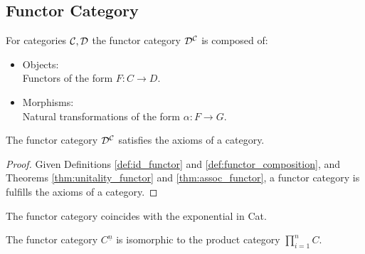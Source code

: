 \subsection{Functor Category}
\begin{definition}
  For categories $\mathcal{C}, \mathcal{D}$ the functor category $\mathcal{D}^{\mathcal{C}}$ is composed of:
  \parencite{leinster:basic_category_theory}
  \begin{itemize}
    \item Objects:\\
      Functors of the form $F:C\to D$.
    \item Morphisms:\\
      Natural transformations of the form $\alpha:F\to G$.
  \end{itemize}
\end{definition}

\begin{theorem}
  The functor category $\mathcal{D}^{\mathcal{C}}$ satisfies the axioms of a category.

  \begin{proof}
    Given Definitions \ref{def:id_functor} and \ref{def:functor_composition},
    and Theorems \ref{thm:unitality_functor} and \ref{thm:assoc_functor}, a
    functor category is fulfills the axioms of a category.
  \end{proof}
\end{theorem}

\begin{remark}
  The functor category coincides with the exponential in Cat.
\end{remark}

\begin{remark}
  The functor category $C^{\underline{n}}$ is isomorphic to the product category
  $\prod_{i=1}^n C$.
\end{remark}